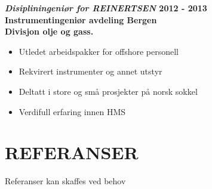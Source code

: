 \documentclass[margin, 10pt, norsk]{res} %
\begin{document}
\begin{resume}
\textbf{\emph{Disipliningeniør for REINERTSEN} \hfill 2012 - 2013 \\
Instrumentingeniør avdeling Bergen\\
Divisjon olje og gass.}
\begin{itemize} \itemsep -2pt %
\item Utledet arbeidspakker for offshore personell 
\item Rekvirert instrumenter og annet utstyr
\item Deltatt i store og små prosjekter på norsk sokkel
\item Verdifull erfaring innen HMS
\end{itemize}

\hspace{5mm} 

\section{REFERANSER} 
Referanser kan skaffes ved behov



\hspace{5mm} 


\end{resume}
\end{document}
